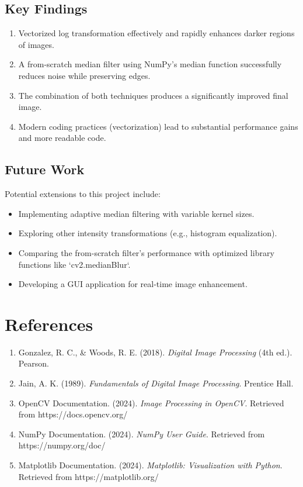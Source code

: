 \documentclass[12pt,a4paper]{article}
\begin{document}
\subsection{Key Findings}
\begin{enumerate}
    \item Vectorized log transformation effectively and rapidly enhances darker regions of images.
    \item A from-scratch median filter using NumPy's median function successfully reduces noise while preserving edges.
    \item The combination of both techniques produces a significantly improved final image.
    \item Modern coding practices (vectorization) lead to substantial performance gains and more readable code.
\end{enumerate}

\subsection{Future Work}
Potential extensions to this project include:
\begin{itemize}
    \item Implementing adaptive median filtering with variable kernel sizes.
    \item Exploring other intensity transformations (e.g., histogram equalization).
    \item Comparing the from-scratch filter's performance with optimized library functions like `cv2.medianBlur`.
    \item Developing a GUI application for real-time image enhancement.
\end{itemize}

\newpage
\section{References}

\begin{enumerate}
    \item Gonzalez, R. C., \& Woods, R. E. (2018). \textit{Digital Image Processing} (4th ed.). Pearson.
    \item Jain, A. K. (1989). \textit{Fundamentals of Digital Image Processing}. Prentice Hall.
    \item OpenCV Documentation. (2024). \textit{Image Processing in OpenCV}. Retrieved from https://docs.opencv.org/
    \item NumPy Documentation. (2024). \textit{NumPy User Guide}. Retrieved from https://numpy.org/doc/
    \item Matplotlib Documentation. (2024). \textit{Matplotlib: Visualization with Python}. Retrieved from https://matplotlib.org/
\end{enumerate}
\end{document}
